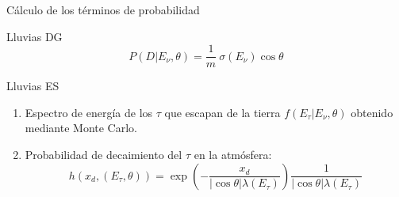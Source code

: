 % 
\begin{frame}{C\'alculo de los t\'erminos de probabilidad}
\footnotesize
 \begin{block}{Lluvias DG}
  \centering
  $$
   P(D|E_{\nu},\theta) = \frac{1}{m}~\sigma(E_{\nu})\cos\theta
   $$
 \end{block}
 
 \begin{block}{Lluvias ES}
  \begin{enumerate}
   \item Espectro de energ\'ia de los $\tau$ que escapan de la tierra $f(E_\tau|E_\nu,\theta)$ obtenido mediante Monte Carlo.
	\begin{center}
	\end{center}
   \item Probabilidad de decaimiento del $\tau$ en la atm\'osfera:
   \begin{displaymath}
    h(x_d,(E_\tau,\theta))=
		\exp{\left(
		-\frac{x_d}{|\cos\theta|\lambda(E_\tau)}
		\right)}
		\frac{1}{|\cos\theta|\lambda(E_\tau)}
   \end{displaymath}
  \end{enumerate}
 \end{block}
\end{frame}
 
